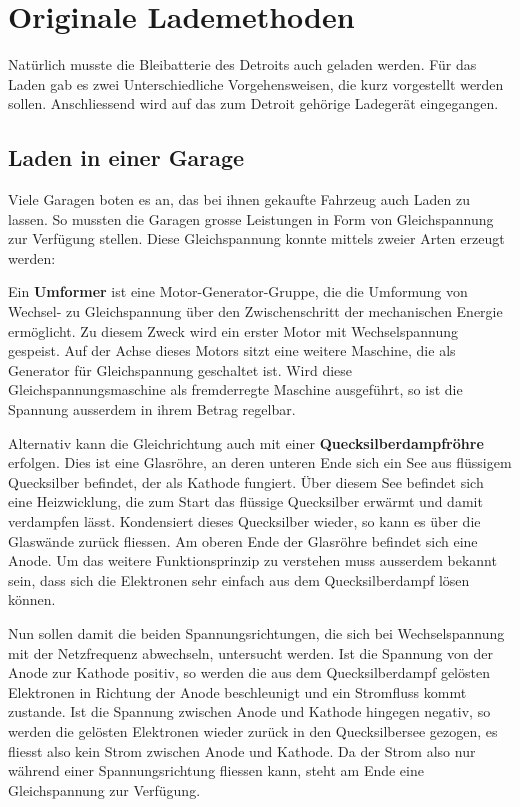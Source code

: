 \section{Originale Lademethoden}

Natürlich musste die Bleibatterie des Detroits auch geladen werden. Für das Laden gab es zwei Unterschiedliche Vorgehensweisen, die kurz vorgestellt werden sollen. Anschliessend wird auf das zum Detroit gehörige Ladegerät eingegangen.

\subsection{Laden in einer Garage}
Viele Garagen boten es an, das bei ihnen gekaufte Fahrzeug auch Laden zu lassen. So mussten die Garagen grosse Leistungen in Form von Gleichspannung zur Verfügung stellen. Diese Gleichspannung konnte mittels zweier Arten erzeugt werden:

Ein \textbf{Umformer} ist eine Motor-Generator-Gruppe, die die Umformung von Wechsel- zu Gleichspannung über den Zwischenschritt der mechanischen Energie ermöglicht. Zu diesem Zweck wird ein erster Motor mit Wechselspannung gespeist. Auf der Achse dieses Motors sitzt eine weitere Maschine, die als Generator für Gleichspannung geschaltet ist. Wird diese Gleichspannungsmaschine als fremderregte Maschine ausgeführt, so ist die Spannung ausserdem in ihrem Betrag regelbar.

Alternativ kann die Gleichrichtung auch mit einer \textbf{Quecksilberdampfröhre} erfolgen. Dies ist eine Glasröhre, an deren unteren Ende sich ein See aus flüssigem Quecksilber befindet, der als Kathode fungiert. Über diesem See befindet sich eine Heizwicklung, die zum Start das flüssige Quecksilber erwärmt und damit verdampfen lässt. Kondensiert dieses Quecksilber wieder, so kann es über die Glaswände zurück fliessen. Am oberen Ende der Glasröhre befindet sich eine Anode. Um das weitere Funktionsprinzip zu verstehen muss ausserdem bekannt sein, dass sich die Elektronen sehr einfach aus dem Quecksilberdampf lösen können.

Nun sollen damit die beiden Spannungsrichtungen, die sich bei Wechselspannung mit der Netzfrequenz abwechseln, untersucht werden. Ist die Spannung von der Anode zur Kathode positiv, so werden die aus dem Quecksilberdampf gelösten Elektronen in Richtung der Anode beschleunigt und ein Stromfluss kommt zustande. Ist die Spannung zwischen Anode und Kathode hingegen negativ, so werden die gelösten Elektronen wieder zurück in den Quecksilbersee gezogen, es fliesst also kein Strom zwischen Anode und Kathode. Da der Strom also nur während einer Spannungsrichtung fliessen kann, steht am Ende eine Gleichspannung zur Verfügung.

